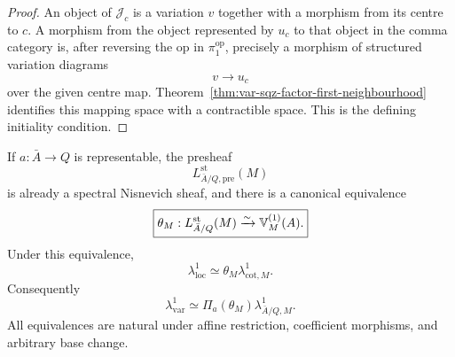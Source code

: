 \begin{proof}
An object of \(\mathcal J_c\) is a variation \(v\) together with a morphism from its centre to \(c\). A morphism from the object represented by \(u_c\) to that object in the comma category is, after reversing the \(\mathrm{op}\) in \(\pi_1^{\mathrm{op}}\), precisely a morphism of structured variation diagrams
\[
    v\longrightarrow u_c
\]
over the given centre map. Theorem~\ref{thm:var-sqz-factor-first-neighbourhood} identifies this mapping space with a contractible space. This is the defining initiality condition.
\end{proof}

\begin{theorem}
\label{thm:var-first-represented-comparison}
If \(a:\bar A\to Q\) is representable, the presheaf
\[
    L^{\mathrm{st}}_{\bar A/Q,\mathrm{pre}}(M)
\]
is already a spectral Nisnevich sheaf, and there is a canonical equivalence
\[
    \boxed{
    \theta_M:
    L^{\mathrm{st}}_{\bar A/Q}(M)
    \xrightarrow{\sim}
    \mathbb V^{(1)}_M(A).
    }
\]
Under this equivalence,
\[
    \boxed{
    \lambda^1_{\mathrm{loc}}
    \simeq
    \theta_M\lambda^1_{\mathrm{cot},M}.
    }
\]
Consequently
\[
    \boxed{
    \lambda^1_{\mathrm{var}}
    \simeq
    \Pi_a(\theta_M)\lambda^1_{\bar A/Q,M}.
    }
\]
All equivalences are natural under affine restriction, coefficient morphisms, and arbitrary base change.
\end{theorem}

